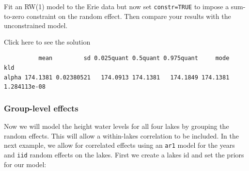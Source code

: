 \documentclass[
  letterpaper,
  DIV=11,
  numbers=noendperiod]{scrartcl}
\newenvironment{Shaded}{\begin{snugshade}}{\end{snugshade}}
\newcommand{\AttributeTok}[1]{\textcolor[rgb]{0.40,0.45,0.13}{#1}}
\newcommand{\CommentTok}[1]{\textcolor[rgb]{0.37,0.37,0.37}{#1}}
\newcommand{\ConstantTok}[1]{\textcolor[rgb]{0.56,0.35,0.01}{#1}}
\newcommand{\DecValTok}[1]{\textcolor[rgb]{0.68,0.00,0.00}{#1}}
\newcommand{\ErrorTok}[1]{\textcolor[rgb]{0.68,0.00,0.00}{#1}}
\newcommand{\FunctionTok}[1]{\textcolor[rgb]{0.28,0.35,0.67}{#1}}
\newcommand{\NormalTok}[1]{\textcolor[rgb]{0.00,0.23,0.31}{#1}}
\newcommand{\OtherTok}[1]{\textcolor[rgb]{0.00,0.23,0.31}{#1}}
\newcommand{\SpecialCharTok}[1]{\textcolor[rgb]{0.37,0.37,0.37}{#1}}
\newcommand{\StringTok}[1]{\textcolor[rgb]{0.13,0.47,0.30}{#1}}
\begin{document}
\begin{tcolorbox}[enhanced jigsaw, breakable, arc=.35mm, opacitybacktitle=0.6, left=2mm, toptitle=1mm, title={Task}, colframe=quarto-callout-warning-color-frame, rightrule=.15mm, coltitle=black, colback=white, colbacktitle=quarto-callout-warning-color!10!white, bottomtitle=1mm, opacityback=0, bottomrule=.15mm, toprule=.15mm, titlerule=0mm, leftrule=.75mm]

Fit an RW(1) model to the Erie data but now set \texttt{constr=TRUE} to
impose a sum-to-zero constraint on the random effect. Then compare your
results with the unconstrained model.

Click here to see the solution

\begin{Shaded}
\end{Shaded}

\begin{verbatim}
          mean         sd 0.025quant 0.5quant 0.975quant     mode          kld
alpha 174.1381 0.02380521   174.0913 174.1381   174.1849 174.1381 1.284113e-08
\end{verbatim}

\end{tcolorbox}

\subsubsection{Group-level effects}\label{group-level-effects}

Now we will model the height water levels for all four lakes by grouping
the random effects. This will allow a within-lakes correlation to be
included. In the next example, we allow for correlated effects using an
\texttt{ar1} model for the years and \texttt{iid} random effects on the
lakes. First we create a lakes id and set the priors for our model:
\end{document}
